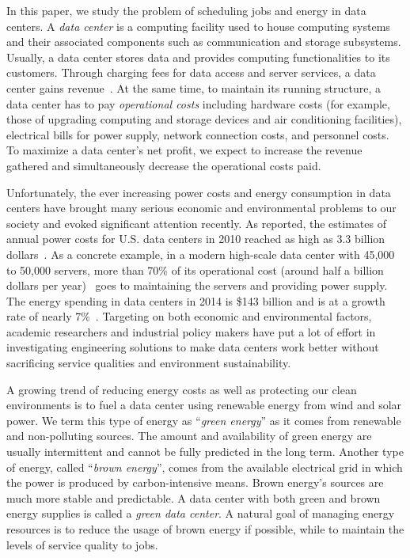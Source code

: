 \documentclass[conference]{IEEEtran}
\begin{document}
In this paper, we study the problem of scheduling jobs and energy in data centers. A \emph{data center} is a computing facility used to house computing systems and their associated components such as communication and storage subsystems. Usually, a data center stores data and provides computing functionalities to its customers. Through charging fees for data access and server services, a data center gains revenue~\cite{amazonprice}. At the same time, to maintain its running structure, a data center has to pay \emph{operational costs} including hardware costs (for example, those of upgrading computing and storage devices and air conditioning facilities), electrical bills for power supply, network connection costs, and personnel costs. To maximize a data center's net profit, we expect to increase the revenue gathered and simultaneously decrease the operational costs paid.

Unfortunately, the ever increasing power costs and energy consumption in data centers have brought many serious economic and environmental problems to our society and evoked significant attention recently. As reported, the estimates of annual power costs for U.S. data centers in 2010 reached as high as $3.3$ billion dollars~\cite{EnergyCost}. As a concrete example, in a modern high-scale data center with 45,000 to 50,000 servers, more than 70\% of its operational cost (around half a billion dollars per year)~\cite{usage} goes to maintaining the servers and providing power supply. The energy spending in data centers in 2014 is \$143 billion and is at a growth rate of nearly 7\%~\cite{inforweek}. Targeting on both economic and environmental factors, academic researchers and industrial policy makers have put a lot of effort in investigating engineering solutions to make data centers work better without sacrificing service qualities and environment sustainability.

A growing trend of reducing energy costs as well as protecting our clean environments is to fuel a data center using renewable energy from wind and solar power. We term this type of energy as ``\emph{green energy}'' as it comes from renewable and non-polluting sources. The amount and availability of green energy are usually intermittent and cannot be fully predicted in the long term. Another type of energy, called ``\emph{brown energy}'', comes from the available electrical grid in which the power is produced by carbon-intensive means. Brown energy's sources are much more stable and predictable. A data center with both green and brown energy supplies is called a \emph{green data center}. A natural goal of managing energy resources is to reduce the usage of brown energy if possible, while to maintain the levels of service quality to jobs.
\end{document}
